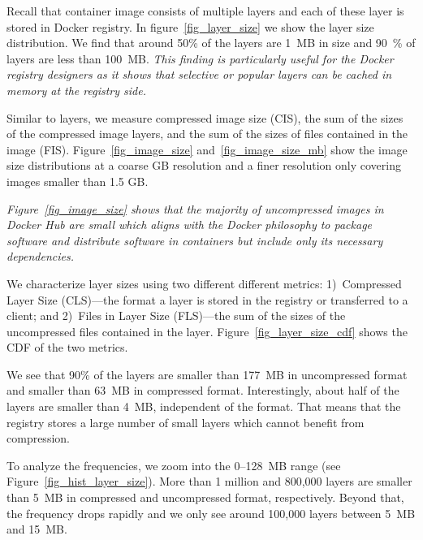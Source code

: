 Recall that container image consists of multiple layers and each of these layer
is stored in Docker registry.  In figure~\ref{fig_layer_size} we show the layer
size distribution. We find that around 50\% of the layers are 1~MB in size and
90~\% of layers are less than 100~MB. \emph{This finding is particularly useful for
the Docker registry designers as it shows that selective or popular layers can
be cached in memory at the registry side.}

Similar to layers, we measure compressed image size (CIS), \ie the sum of the
sizes of the compressed image layers, and the sum of the sizes of files
contained in the image (FIS). Figure~\ref{fig_image_size}
and~\ref{fig_image_size_mb} show the image size distributions at a coarse GB
resolution and a finer resolution only covering images smaller than 1.5 GB.

\emph{Figure~\ref{fig_image_size} shows that the majority of uncompressed images in
Docker Hub are small which aligns with the Docker philosophy to package
software and distribute software in containers but include only its necessary
dependencies.}


We characterize layer sizes using two different different metrics:
1)~Compressed Layer Size (CLS)---the format a layer is stored in the registry
or transferred to a client;
and 2)~Files in Layer Size (FLS)---the sum of the sizes of the uncompressed
files contained in the layer.
Figure~\ref{fig_layer_size_cdf} shows the CDF of the two metrics.

We see that 90\% of the layers are smaller than 177~MB in uncompressed format
and smaller than 63~MB in compressed format.
Interestingly, about half of the layers are smaller than 4~MB, independent of
the format. That means that the registry stores a large number of small layers
which cannot benefit from compression.

To analyze the frequencies, we zoom into the 0--128~MB range (see
Figure~\ref{fig_hist_layer_size}).
More than 1 million and 800,000 layers are smaller than 5~MB in compressed and
uncompressed format, respectively. Beyond that, the frequency drops rapidly and
we only see around 100,000 layers between 5~MB and 15~MB.


